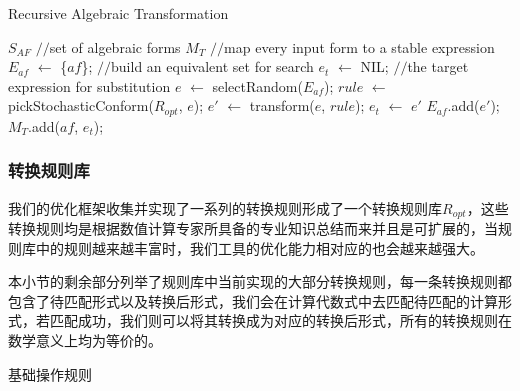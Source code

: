 \begin{algorithm}[tb]
  \caption{Recursive Algebraic Transformation}
  \label{alg:stoctrans}
\begin{algorithmic}[1]
\REQUIRE $S_{AF}$ \hfill {{\footnotesize$//$}\small set of algebraic forms}
\ENSURE $M_{T}$  {{\footnotesize$//$}\small map every input form to a stable expression} %
      \STATE $E_{af}$ $\leftarrow$ \{$af$\}; \hfill {{\footnotesize$//$}\small build an equivalent set for search} \label{alg:stoctrans:eqset}
      \STATE $e_t$ $\leftarrow$ NIL; \hfill {{\footnotesize$//$}\small the target expression for substitution}
      \REPEAT
        \STATE $e$ $\leftarrow$ selectRandom($E_{af}$); \label{alg:stoctrans:expselect}%
        \STATE $rule$ $\leftarrow$ pickStochasticConform($R_{opt}$, $e$); \label{alg:stoctrans:rulepick}
        \STATE $e'$ $\leftarrow$ transform($e$, $rule$); \label{alg:stoctrans:applytrans}
         \label{alg:stoctrans:stableverify}
          \STATE $e_t$ $\leftarrow$ $e'$ \label{alg:stoctrans:getet}
        \ELSE
          \STATE $E_{af}$.add($e'$); \label{alg:stoctrans:putbackep}%
        \ENDIF
      \STATE $M_{T}$.add($af$, $e_t$); \label{alg:stoctrans:resultmap}
    \ENDFOR
\end{algorithmic}
\end{algorithm}

\subsubsection{转换规则库}

我们的优化框架收集并实现了一系列的转换规则形成了一个转换规则库$R_{opt}$，这些转换规则均是根据数值计算专家所具备的专业知识总结而来并且是可扩展的，当规则库中的规则越来越丰富时，我们工具的优化能力相对应的也会越来越强大。
 
本小节的剩余部分列举了规则库中当前实现的大部分转换规则，每一条转换规则都包含了待匹配形式以及转换后形式，我们会在计算代数式中去匹配待匹配的计算形式，若匹配成功，我们则可以将其转换成为对应的转换后形式，所有的转换规则在数学意义上均为等价的。

\vspace{1mm}
\begin{center}
{\kaishu{} 基础操作规则}
\end{center}
\vspace{1mm}

